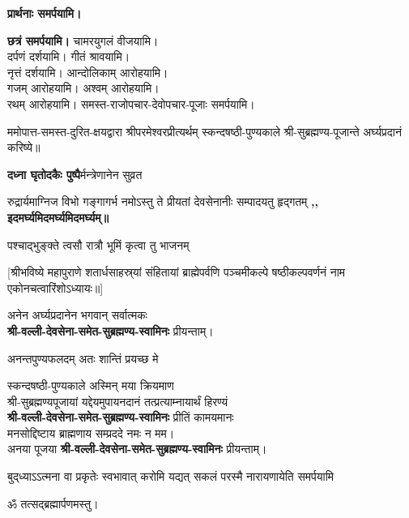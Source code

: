 \begin{center}
\textbf{\devAya{} प्रार्थनाः समर्पयामि।}

\textbf{\devAya{} छत्रं समर्पयामि।}
चामरयुगलं वीजयामि।\\
दर्पणं दर्शयामि। गीतं श्रावयामि। \\
नृत्तं दर्शयामि। आन्दोलिकाम् आरोहयामि।\\
गजम् आरोहयामि। अश्वम् आरोहयामि।\\
रथम् आरोहयामि। समस्त-राजोपचार-देवोपचार-पूजाः समर्पयामि।


ममोपात्त-समस्त-दुरित-क्षयद्वारा श्रीपरमेश्वरप्रीत्यर्थम् स्कन्दषष्ठी-पुण्यकाले श्री-सुब्रह्मण्य-पूजान्ते अर्घ्यप्रदानं करिष्ये॥

\medskip

{\textbf{दध्ना घृतोदकैः पुष्पै}र्मन्त्रेणानेन सुव्रत}

{रुद्रार्यमाग्निज विभो गङ्गागर्भ नमोऽस्तु ते}
{प्रीयतां देवसेनानीः सम्पादयतु हृद्गतम्}
\textbf{\devAya{},, इदमर्घ्यमिदमर्घ्यमिदमर्घ्यम्॥\medskip}

{पश्चाद्भुङ्क्ते त्वसौ रात्रौ भूमिं कृत्वा तु भाजनम्}

[श्रीभविष्ये महापुराणे शतार्धसाहस्र्यां संहितायां ब्राह्मेपर्वणि पञ्चमीकल्पे षष्ठीकल्पवर्णनं नाम एकोनचत्वारिंशोऽध्यायः॥]


अनेन अर्घ्यप्रदानेन भगवान् सर्वात्मकः\\ \textbf{श्री-वल्ली-देवसेना-समेत-सुब्रह्मण्य-स्वामिनः} प्रीयन्ताम्।\medskip

{अनन्तपुण्यफलदम् अतः शान्तिं प्रयच्छ मे}

स्कन्दषष्ठी-पुण्यकाले अस्मिन् मया क्रियमाण\\
श्री-सुब्रह्मण्यपूजायां यद्देयमुपायनदानं तत्प्रत्याम्नायार्थं हिरण्यं\\
\textbf{श्री-वल्ली-देवसेना-समेत-सुब्रह्मण्य-स्वामिनः} प्रीतिं कामयमानः\\
मनसोद्दिष्टाय ब्राह्मणाय सम्प्रददे नमः न मम।\\ 
अनया पूजया \textbf{श्री-वल्ली-देवसेना-समेत-सुब्रह्मण्य-स्वामिनः} प्रीयन्ताम्। 
 

{बुद्‌ध्याऽऽत्मना वा प्रकृतेः स्वभावात्}
{करोमि यद्यत् सकलं परस्मै}
{नारायणायेति समर्पयामि}

ॐ तत्सद्ब्रह्मार्पणमस्तु।

\end{center}